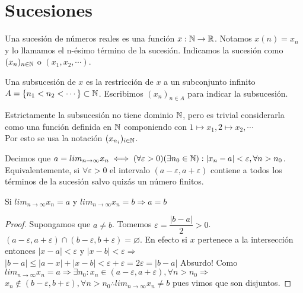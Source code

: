 \section{Sucesiones}

Una sucesión de números reales es una función $x: \mathbb{N} \to \mathbb{R}$. Notamos $x(n) = x_n$ y lo llamamos el n-ésimo término de la sucesión. Indicamos la sucesión como $(x_n)_{n \in \mathbb{N}}$ o $(x_1, x_2, \cdots)$.

Una subsucesión de $x$ es la restricción de $x$ a un subconjunto infinito $A = \{ n_1 < n_2 < \cdots \} \subset \mathbb{N}$. Escribimos $(x_n)_{n \in A}$ para indicar la subsucesión.

\begin{note}
  Estrictamente la subsucesión no tiene dominio $\mathbb{N}$, pero es trivial considerarla como una función definida en $\mathbb{N}$ componiendo con $1 \mapsto x_1, 2 \mapsto x_2, \cdots$ \\
  Por esto se usa la notación $(x_{n_i})_{i \in \mathbb{N}}$.
\end{note}

\begin{definition}
  Decimos que $a = lim_{n \to \infty} x_n \iff (\forall \varepsilon > 0)(\exists n_0 \in \mathbb{N}) : |x_n - a| < \varepsilon, \forall n > n_0$. \\
  Equivalentemente, si $\forall \varepsilon > 0$ el intervalo $(a-\varepsilon, a+\varepsilon)$ contiene a todos los términos de la sucesión salvo quizás un número finitos.
\end{definition}

\begin{theorem}
  Si $lim_{n \to \infty} x_n = a$ y $lim_{n \to \infty} x_n = b \Rightarrow a=b$
  \begin{proof}
    Supongamos que $a \neq b$. Tomemos $\varepsilon = \dfrac{|b-a|}{2} > 0$. \\
    $(a - \varepsilon, a+\varepsilon) \cap (b-\varepsilon, b+\varepsilon) = \varnothing$. En efecto si 
    $x$ pertenece a la intersección entonces $|x-a| < \varepsilon$ y $|x-b| < \varepsilon \Rightarrow$ \\
    $|b-a| \leq |a-x| + |x-b| < \varepsilon + \varepsilon = 2 \varepsilon = |b-a|$ Absurdo!
    Como $lim_{n \to \infty} x_n = a \Rightarrow \exists n_0 : x_n \in (a - \varepsilon, a+ \varepsilon), \forall n > n_0 \Rightarrow$ \\
    $x_n \notin (b-\varepsilon, b+\varepsilon), \forall n > n_0 \therefore lim_{n \to \infty} x_n \neq b$ pues vimos que son disjuntos. 
  \end{proof}
\end{theorem}

